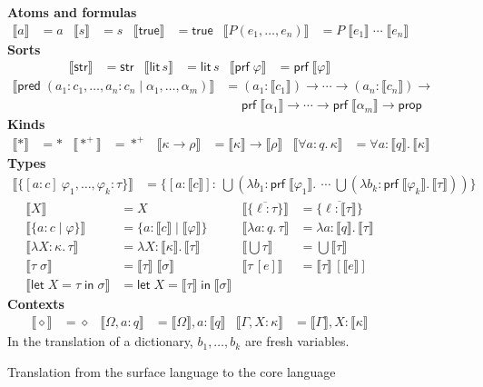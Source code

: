 \documentclass[11pt]{article}
\newcommand{\kw}[1]{\mathsf{#1}}
\newcommand{\str}{\kw{str}}
\newcommand{\lit}[1]{\kw{lit}\,#1}
\newcommand{\prop}{\kw{prop}}
\newcommand{\prf}[1]{\kw{prf}\;#1}
\newcommand{\pred}[1]{\kw{pred}\;#1}
\newcommand{\true}{\kw{true}}
\newcommand{\letin}[3]{\kw{let}\;#1 = #2\;\kw{in}\;#3}
\newcommand{\proper}{\ast}
\newcommand{\populated}{\ast^{+}}
\newcommand{\kall}[3]{\forall #1 : #2.\,#3}
\newcommand{\dict}[3]{\{[#1 : #2] : #3\}}
\newcommand{\gdict}[4]{\{[#1 : #2]\ #3 : #4\}}
\newcommand{\refine}[3]{\{#1 : #2 \mid #3\}}
\newcommand{\iabs}[3]{\lambda #1 : #2.\,#3}
\newcommand{\tabs}[3]{\lambda #1 : #2.\,#3}
\newcommand{\union}[1]{\textstyle\bigcup #1}
\newcommand{\iapp}[2]{#1\,[#2]}
\newcommand{\emptyctx}{\diamond}
\newcommand{\sem}[1]{\llbracket #1 \rrbracket}
\theoremstyle{remark}
\begin{document}
\begin{figure}[!htbp]
\textbf{Atoms and formulas}
\begin{align*}
\sem{a} &= a &
\sem{s} &= s &
\sem{\true} &= \true &
\sem{P(e_1, \ldots, e_n)} &= P\;\sem{e_1}\;\cdots\;\sem{e_n}
\end{align*}
\textbf{Sorts}
\begin{align*}
\sem{\str} &= \str &
\sem{\lit{s}} &= \lit{s} &
\sem{\prf{\varphi}} &= \prf{\sem{\varphi}}
\end{align*}
\begin{align*}
\sem{\pred{(a_1 : c_1, \ldots, a_n : c_n \mid \alpha_1, \ldots, \alpha_m)}}
  &= (a_1 : \sem{c_1}) \to \cdots \to (a_n : \sem{c_n}) \to {} \\
  &\phantom{{}={}} \prf{\sem{\alpha_1}} \to \cdots \to \prf{\sem{\alpha_m}} \to \prop
\end{align*}
\textbf{Kinds}
\begin{align*}
\sem{\proper} &= \proper &
\sem{\populated} &= \populated &
\sem{\kappa \to \rho} &= \sem{\kappa} \to \sem{\rho} &
\sem{\kall{a}{q}{\kappa}} &= \kall{a}{\sem{q}}{\sem{\kappa}}
\end{align*}
\textbf{Types}
\begin{align*}
\sem{\gdict{a}{c}{\varphi_1, \ldots, \varphi_k}{\tau}}
  &= \dict{a}{\sem{c}}{\ \union{(\iabs{b_1}{\prf{\sem{\varphi_1}}}{\ \cdots\
       \union{(\iabs{b_k}{\prf{\sem{\varphi_k}}}{\sem{\tau}})}})}}
\end{align*}
\begin{align*}
\sem{X} &= X &
\sem{\{\overline{\ell : \tau}\}} &= \{\overline{\ell : \sem{\tau}}\} \\
\sem{\refine{a}{c}{\varphi}} &= \refine{a}{\sem{c}}{\sem{\varphi}} &
\sem{\iabs{a}{q}{\tau}} &= \iabs{a}{\sem{q}}{\sem{\tau}} \\
\sem{\tabs{X}{\kappa}{\tau}} &= \tabs{X}{\sem{\kappa}}{\sem{\tau}} &
\sem{\union{\tau}} &= \union{\sem{\tau}} \\
\sem{\tau\;\sigma} &= \sem{\tau}\;\sem{\sigma} &
\sem{\iapp{\tau}{e}} &= \iapp{\sem{\tau}}{\sem{e}} \\
\sem{\letin{X}{\tau}{\sigma}} &= \letin{X}{\sem{\tau}}{\sem{\sigma}}
\end{align*}
\textbf{Contexts}
\begin{align*}
\sem{\emptyctx} &= \emptyctx &
\sem{\Omega, a : q} &= \sem{\Omega}, a : \sem{q} &
\sem{\Gamma, X : \kappa} &= \sem{\Gamma}, X : \sem{\kappa}
\end{align*}
In the translation of a dictionary, $b_1, \ldots, b_k$ are fresh variables.
\caption{Translation from the surface language to the core language}
\label{fig:translation}
\end{figure}
\end{document}

